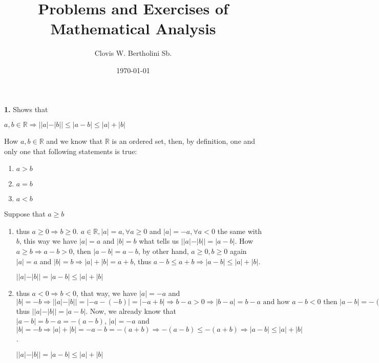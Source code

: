 \documentclass{amsart}
\author{Clovis W. Bertholini Sb.}
\title{Problems and Exercises of Mathematical Analysis}
\date{\today}
\begin{document}
\maketitle
\textbf{1.} Shows that
\begin{center}
$a,b \in \mathbb{R} \Rightarrow ||a|-|b||\leq |a-b| \leq |a|+|b|$
\end{center}
How $a,b\in\mathbb{R}$ and we know that $\mathbb{R}$ is an ordered set, then, by definition, one and only one that following statements is true:
\begin{enumerate}
\item $a>b$
\item $a=b$
\item $a<b$
\end{enumerate}
Suppose that $a\geq b$
\begin{enumerate}
\item thus $a\geq0\Rightarrow b\geq0$. $a\in\mathbb{R},|a|=a, \forall a\geq0$ and $|a|=-a, \forall a<0$ the same with $b$, this way we have $|a|=a$ and $|b|=b$ what tells us $||a|-|b||=|a-b|$. How $a\geq b\Rightarrow a-b>0$, then $|a-b|=a-b$, by other hand, $a\geq0,b\geq0$ again $|a|=a$ and $|b|=b\Rightarrow|a|+|b|=a+b$, thus $a-b\leq a+b\Rightarrow|a-b|\leq|a|+|b|$.
\begin{center}
$||a|-|b||=|a-b|\leq |a|+|b|$
\end{center}
\item thus $a<0 \Rightarrow b<0$, that way, we have $|a|=-a$ and $|b|=-b \Rightarrow ||a|-|b||=|-a-(-b)|=|-a+b| \Rightarrow b-a>0 \Rightarrow |b-a|=b-a \text{ and how }a-b<0 \text{ then }|a-b|=-(a-b)=-a+b=b-a$ thus $||a|-|b||=|a-b|$. Now, we already know that $|a-b|=b-a=-(a-b)$, $|a|=-a$ and $|b|=-b \Rightarrow |a|+|b|=-a-b=-(a+b) \Rightarrow -(a-b)\leq-(a+b)\Rightarrow |a-b|\leq|a|+|b|$.
\begin{center}
$||a|-|b||=|a-b|\leq |a|+|b|$
\end{center}
\end{enumerate}
\end{document}
